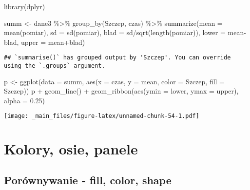 \documentclass[
]{book}
\newenvironment{Shaded}{\begin{snugshade}}{\end{snugshade}}
\newcommand{\AttributeTok}[1]{\textcolor[rgb]{0.77,0.63,0.00}{#1}}
\newcommand{\FloatTok}[1]{\textcolor[rgb]{0.00,0.00,0.81}{#1}}
\newcommand{\FunctionTok}[1]{\textcolor[rgb]{0.00,0.00,0.00}{#1}}
\newcommand{\NormalTok}[1]{#1}
\newcommand{\OtherTok}[1]{\textcolor[rgb]{0.56,0.35,0.01}{#1}}
\newcommand{\SpecialCharTok}[1]{\textcolor[rgb]{0.00,0.00,0.00}{#1}}
\begin{document}
\begin{Shaded}
\begin{Highlighting}[]
\FunctionTok{library}\NormalTok{(dplyr)}

\NormalTok{summ }\OtherTok{\textless{}{-}}\NormalTok{ dane3 }\SpecialCharTok{\%\textgreater{}\%} \FunctionTok{group\_by}\NormalTok{(Szczep, czas) }\SpecialCharTok{\%\textgreater{}\%} 
  \FunctionTok{summarize}\NormalTok{(}\AttributeTok{mean =} \FunctionTok{mean}\NormalTok{(pomiar), }
            \AttributeTok{sd =} \FunctionTok{sd}\NormalTok{(pomiar), }
            \AttributeTok{blad =}\NormalTok{ sd}\SpecialCharTok{/}\FunctionTok{sqrt}\NormalTok{(}\FunctionTok{length}\NormalTok{(pomiar)), }
            \AttributeTok{lower =}\NormalTok{ mean}\SpecialCharTok{{-}}\NormalTok{blad, }
            \AttributeTok{upper =}\NormalTok{ mean}\SpecialCharTok{+}\NormalTok{blad)}
\end{Highlighting}
\end{Shaded}

\begin{verbatim}
## `summarise()` has grouped output by 'Szczep'. You can override using the `.groups` argument.
\end{verbatim}

\begin{Shaded}
\begin{Highlighting}[]
\NormalTok{p }\OtherTok{\textless{}{-}} \FunctionTok{ggplot}\NormalTok{(}\AttributeTok{data =}\NormalTok{ summ, }\FunctionTok{aes}\NormalTok{(}\AttributeTok{x =}\NormalTok{ czas, }\AttributeTok{y =}\NormalTok{ mean, }\AttributeTok{color =}\NormalTok{ Szczep, }\AttributeTok{fill =}\NormalTok{ Szczep))}
\NormalTok{p }\SpecialCharTok{+} \FunctionTok{geom\_line}\NormalTok{() }\SpecialCharTok{+} \FunctionTok{geom\_ribbon}\NormalTok{(}\FunctionTok{aes}\NormalTok{(}\AttributeTok{ymin =}\NormalTok{ lower, }\AttributeTok{ymax =}\NormalTok{ upper), }\AttributeTok{alpha =} \FloatTok{0.25}\NormalTok{)}
\end{Highlighting}
\end{Shaded}

\texttt{[image: \_main\_files/figure-latex/unnamed-chunk-54-1.pdf]}

\hypertarget{kolory-osie-panele}{%
\section{Kolory, osie, panele}\label{kolory-osie-panele}}

\hypertarget{poruxf3wnywanie---fill-color-shape}{%
\subsection{Porównywanie - fill, color, shape}\label{poruxf3wnywanie---fill-color-shape}}
\end{document}

